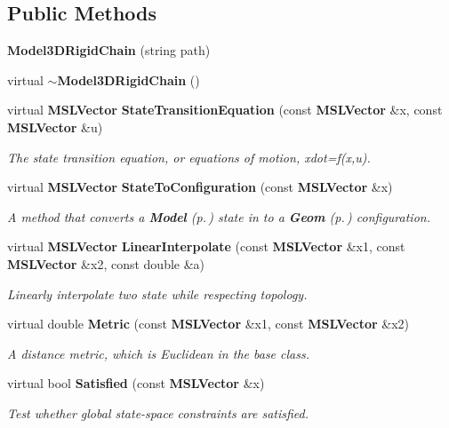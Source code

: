 \subsection*{Public Methods}
\begin{CompactItemize}
\item 
{\bf Model3DRigid\-Chain} (string path)
\item 
virtual {\bf $\sim$Model3DRigid\-Chain} ()
\item 
virtual {\bf MSLVector} {\bf State\-Transition\-Equation} (const {\bf MSLVector} \&x, const {\bf MSLVector} \&u)
\begin{CompactList}\small\item\em The state transition equation, or equations of motion, xdot=f(x,u).\item\end{CompactList}\item 
virtual {\bf MSLVector} {\bf State\-To\-Configuration} (const {\bf MSLVector} \&x)
\begin{CompactList}\small\item\em A method that converts a {\bf Model} {\rm (p.\,\pageref{classModel})} state in to a {\bf Geom} {\rm (p.\,\pageref{classGeom})} configuration.\item\end{CompactList}\item 
virtual {\bf MSLVector} {\bf Linear\-Interpolate} (const {\bf MSLVector} \&x1, const {\bf MSLVector} \&x2, const double \&a)
\begin{CompactList}\small\item\em Linearly interpolate two state while respecting topology.\item\end{CompactList}\item 
virtual double {\bf Metric} (const {\bf MSLVector} \&x1, const {\bf MSLVector} \&x2)
\begin{CompactList}\small\item\em A distance metric, which is Euclidean in the base class.\item\end{CompactList}\item 
virtual bool {\bf Satisfied} (const {\bf MSLVector} \&x)
\begin{CompactList}\small\item\em Test whether global state-space constraints are satisfied.\item\end{CompactList}\end{CompactItemize}
